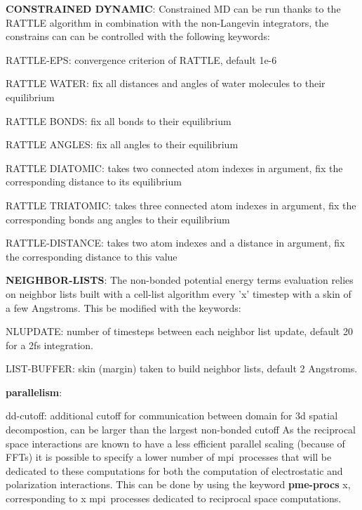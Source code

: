 {\bfseries C\-O\-N\-S\-T\-R\-A\-I\-N\-E\-D D\-Y\-N\-A\-M\-I\-C}\-: Constrained M\-D can be run thanks to the R\-A\-T\-T\-L\-E algorithm in combination with the non-\/\-Langevin integrators, the constrains can can be controlled with the following keywords\-:
\begin{DoxyItemize}
\item R\-A\-T\-T\-L\-E-\/\-E\-P\-S\-: convergence criterion of R\-A\-T\-T\-L\-E, default 1e-\/6
\item R\-A\-T\-T\-L\-E W\-A\-T\-E\-R\-: fix all distances and angles of water molecules to their equilibrium
\item R\-A\-T\-T\-L\-E B\-O\-N\-D\-S\-: fix all bonds to their equilibrium
\item R\-A\-T\-T\-L\-E A\-N\-G\-L\-E\-S\-: fix all angles to their equilibrium
\item R\-A\-T\-T\-L\-E D\-I\-A\-T\-O\-M\-I\-C\-: takes two connected atom indexes in argument, fix the corresponding distance to its equilibrium
\item R\-A\-T\-T\-L\-E T\-R\-I\-A\-T\-O\-M\-I\-C\-: takes three connected atom indexes in argument, fix the corresponding bonds ang angles to their equilibrium
\item R\-A\-T\-T\-L\-E-\/\-D\-I\-S\-T\-A\-N\-C\-E\-: takes two atom indexes and a distance in argument, fix the corresponding distance to this value
\end{DoxyItemize}

{\bfseries N\-E\-I\-G\-H\-B\-O\-R-\/\-L\-I\-S\-T\-S}\-: The non-\/bonded potential energy terms evaluation relies on neighbor lists built with a cell-\/list algorithm every 'x' timestep with a skin of a few Angstroms. This be modified with the keywords\-:
\begin{DoxyItemize}
\item N\-L\-U\-P\-D\-A\-T\-E\-: number of timesteps between each neighbor list update, default 20 for a 2fs integration.
\item L\-I\-S\-T-\/\-B\-U\-F\-F\-E\-R\-: skin (margin) taken to build neighbor lists, default 2 Angstroms.
\end{DoxyItemize}

{\bfseries parallelism}\-:
\begin{DoxyItemize}
\item dd-\/cutoff\-: additional cutoff for communication between domain for 3d spatial decompostion, can be larger than the largest non-\/bonded cutoff As the reciprocal space interactions are known to have a less efficient parallel scaling (because of F\-F\-Ts) it is possible to specify a lower number of mpi processes that will be dedicated to these computations for both the computation of electrostatic and polarization interactions. This can be done by using the keyword {\bfseries pme-\/procs} {\ttfamily x}, corresponding to {\ttfamily x} mpi processes dedicated to reciprocal space computations.
\end{DoxyItemize}

